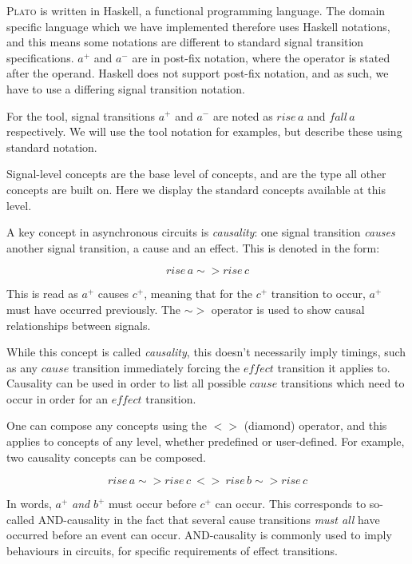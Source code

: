 \documentclass[british,conference,compsoc]{IEEEtran}
\newcommand{\noun}[1]{\textsc{#1}}
\begin{document}
\noun{Plato} is written in Haskell, a functional programming language. The 
domain specific language which we have implemented therefore uses Haskell 
notations, and this means some notations are different to standard signal 
transition specifications. $a^{+}$ and $a^{-}$ are in post-fix notation, where 
the operator is stated after the operand. Haskell does not support post-fix 
notation, and as such, we have to use a differing signal transition notation. 

For the tool, signal transitions $a^{+}$ and $a^{-}$ are noted as $rise\,a$ and 
$fall\,a$ respectively. We will use the tool notation for examples, but 
describe these using standard notation.

Signal-level concepts are the base level of concepts, and are 
the type all other concepts are built on. Here we display the standard concepts
available at this level.

A key concept in asynchronous circuits is \emph{causality}:
one signal transition \emph{causes} another signal transition, a cause and an 
effect. This is denoted in the form: 

\vspace{-3mm}

\[
rise\,a \sim> rise\,c
\]

\vspace{-1mm}

This is read as $a^{+}$ causes $c^{+}$, meaning that for the $c^{+}$ transition 
to occur, $a^{+}$ must have occurred previously. The $\sim>$ 
operator is used to show causal relationships between signals.
 
While this concept is called \emph{causality}, this doesn't necessarily imply
timings, such as any $\mathit{cause}$ transition immediately forcing the
 $\mathit{effect}$ transition it applies to. Causality can be used in order to
list all possible $\mathit{cause}$ transitions which need to occur in order
 for an $\mathit{effect}$ transition.

One can compose any concepts using the $<>$ (diamond) operator, and this applies
to concepts of any level, whether predefined or user-defined. For example, 
two causality concepts can be composed.

\vspace{-3mm}

\[
rise\,a\sim> rise\,c\ <> \ rise\,b\sim> rise\,c
\]

\vspace{-1mm}

In words, $a^{+}$ \emph{and} $b^{+}$ must occur before $c^{+}$ can occur. 
This corresponds to so-called AND-causality in the fact that several cause 
transitions \emph{must all} have occurred before an event can occur. 
AND-causality is commonly used to imply behaviours in circuits, for specific 
requirements of effect transitions.  
\end{document}

